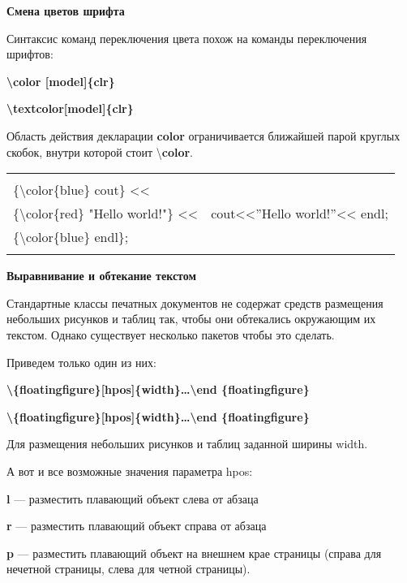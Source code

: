 \documentclass[a4paper,14pt,russian]{extreport}
\begin{document}
\textbf{Смена цветов шрифта}



Синтаксис команд переключения цвета похож на команды переключения шрифтов:

\textbf{\textbackslash color [model]\{clr\}}

\textbf{\textbackslash textcolor[model]\{clr\}}

Область действия декларации \textbf{color} ограничивается ближайшей парой круглых скобок, внутри которой стоит \textbackslash \textbf{color}.

\begin{center}
\begin{tabular}{|l|l|}
\hline
 & \\
\{\textbackslash color\{blue\} cout\} << & \\
\{\textbackslash color\{red\} "Hello world!"\} << & {\color{blue} cout}<<{\color{red}''Hello world!''}<<{\color{blue} endl}; \\
\{\textbackslash color\{blue\} endl\}; & \\
 & \\
\hline
\end{tabular}
\end{center}

\textbf{Выравнивание и обтекание текстом}



Стандартные классы печатных документов не содержат средств размещения небольших рисунков и таблиц так, чтобы они обтекались окружающим их текстом. Однако существует несколько пакетов чтобы это сделать.

Приведем только один из них:

\bigskip
\textbf{\textbackslash \{floatingfigure\}[hpos]\{width\}\ldots\textbackslash end \{floatingfigure\}}

\textbf{\textbackslash \{floatingfigure\}[hpos]\{width\}\ldots\textbackslash end \{floatingfigure\}}
\bigskip

Для размещения небольших рисунков и таблиц заданной ширины width.

А вот и все возможные значения параметра hpos:

\textbf{l} --- разместить плавающий объект слева от абзаца

\textbf{r} --- разместить плавающий объект справа от абзаца

\textbf{p} --- разместить плавающий объект на внешнем крае страницы (справа для нечетной страницы, слева для четной страницы).
\end{document}
